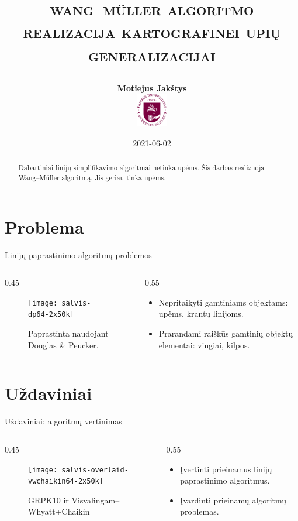 \documentclass[14pt]{beamer}
\title{
    \Large\textsc{wang–müller algoritmo realizacija 
    kartografinei upių generalizacijai}

}
\author{\small \bf Motiejus Jakštys \\[4ex]
    \includegraphics[height=4em]{vu}
}
\date{\small 2021-06-02}
\newcommand{\DP}{Douglas \& Peucker}
\newcommand{\VW}{Visvalingam--Whyatt}
\newcommand{\WM}{Wang--M{\"u}ller}
\newcommand{\twocols}[2]
{
    \begin{columns}[c]
        \begin{column}{0.45\textwidth}
            #1
        \end{column}
        \begin{column}{0.55\textwidth}
            #2
        \end{column}
    \end{columns}
}
\begin{document}

\begin{frame}
\titlepage
\end{frame}

\begin{frame}
  \begin{abstract}

    Dabartiniai linijų simplifikavimo algoritmai netinka upėms. Šis darbas
    realizuoja {\WM} algoritmą. Jis geriau tinka upėms.

  \end{abstract}
\end{frame}

\section{Problema}

\begin{frame}{Linijų paprastinimo algoritmų problemos}
  \twocols{
    \begin{figure}[ht]
      \texttt{[image: salvis-dp64-2x50k]}
      \caption{\footnotesize Paprastinta naudojant {\DP}.}
    \end{figure}
  }{
    \begin{itemize}
      \item Nepritaikyti gamtiniams objektams: upėms, krantų linijoms.
      \item Prarandami raiškūs gamtinių objektų elementai: vingiai, kilpos.
    \end{itemize}
  }
\end{frame}

\section{Uždaviniai}

\begin{frame}{Uždaviniai: algoritmų vertinimas}
  \twocols{
    \begin{figure}[ht]
      \texttt{[image: salvis-overlaid-vwchaikin64-2x50k]}
      \caption{\footnotesize GRPK10 ir {\VW}+Chaikin}
    \end{figure}
  }{
    \begin{itemize}
      \item Įvertinti prieinamus linijų paprastinimo algoritmus.
      \item Įvardinti prieinamų algoritmų problemas.
    \end{itemize}
  }
\end{frame}
\end{document}
